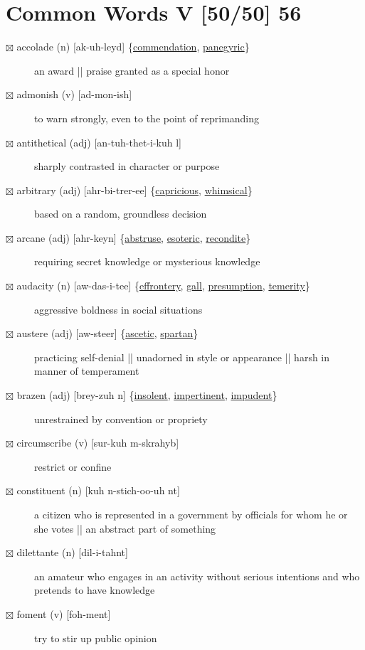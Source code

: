 \documentclass[11pt]{article}
\begin{document}
\section{Common Words V [50/50] 56}
\label{sec:org3b65a0c}
\begin{description}
\item[{$\boxtimes$ \label{org8a0248d}accolade (n) [ak-uh-leyd] \{\hyperref[org0a0f360]{commendation}, \hyperref[org7873186]{panegyric}\}}] an award || praise granted as a special honor
\item[{$\boxtimes$ admonish (v) [ad-mon-ish]}] to warn strongly, even to the point of reprimanding
\item[{$\boxtimes$ antithetical (adj) [an-tuh-thet-i-kuh l]}] sharply contrasted in character or purpose
\item[{$\boxtimes$ \label{org23782c5}arbitrary (adj) [ahr-bi-trer-ee] \{\hyperref[orgef62d01]{capricious}, \hyperref[org77ef95d]{whimsical}\}}] based on a random, groundless decision
\item[{$\boxtimes$ \label{org41835e1}arcane (adj) [ahr-keyn] \{\hyperref[org6ddbcd3]{abstruse}, \hyperref[orga87f059]{esoteric}, \hyperref[org7a770d8]{recondite}\}}] requiring secret knowledge or mysterious knowledge
\item[{$\boxtimes$ \label{org67e3069}audacity (n) [aw-das-i-tee] \{\hyperref[orgfd36353]{effrontery}, \hyperref[orge1299c1]{gall}, \hyperref[org8e41497]{presumption}, \hyperref[org0f0706a]{temerity}\}}] aggressive boldness in social situations
\item[{$\boxtimes$ \label{orgc3d1739}austere (adj) [aw-steer] \{\hyperref[org219adb4]{ascetic}, \hyperref[orgafdcbd2]{spartan}\}}] practicing self-denial || unadorned in style or appearance || harsh in manner of temperament
\item[{$\boxtimes$ \label{orga7c2142}brazen (adj) [brey-zuh n] \{\hyperref[org7d4233d]{insolent}, \hyperref[org66b257e]{impertinent}, \hyperref[orgdac3101]{impudent}\}}] unrestrained by convention or propriety
\item[{$\boxtimes$ circumscribe (v) [sur-kuh m-skrahyb]}] restrict or confine
\item[{$\boxtimes$ constituent (n) [kuh n-stich-oo-uh nt]}] a citizen who is represented in a government by officials for whom he or she votes || an abstract part of something
\item[{$\boxtimes$ dilettante (n) [dil-i-tahnt]}] an amateur who engages in an activity without serious intentions and who pretends to have knowledge
\item[{$\boxtimes$ foment (v) [foh-ment]}] try to stir up public opinion

\end{description}
\end{document}
